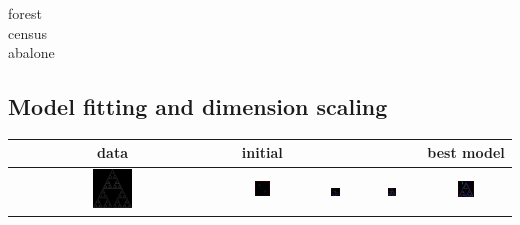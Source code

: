 \documentclass[10pt,a4paper,oneside]{article}
\theoremstyle{definition}
\begin{document}
\begin{description}
  \item[forest]
  \item[census]
  \item[abalone]
\end{description}

\subsection*{Model fitting and dimension scaling}

\begin{table}[p]
\begin{tabular}{c c c c c}
\hline
data & initial & & & best model \\
\hline
    \includegraphics[width=0.2\textwidth]{../img/runs2d/sierpinski/data.png}
& 
    \includegraphics[width=0.2\textwidth]{../img/runs2d/sierpinski/generation0000.png}
& 
    \includegraphics[width=0.2\textwidth]{../img/runs2d/sierpinski/generation0001.png}
& 
    \includegraphics[width=0.2\textwidth]{../img/runs2d/sierpinski/generation0010.png}
& 
    \includegraphics[width=0.2\textwidth]{../img/runs2d/sierpinski/generation0032.png}

\end{tabular}
\end{table}
\end{document}
